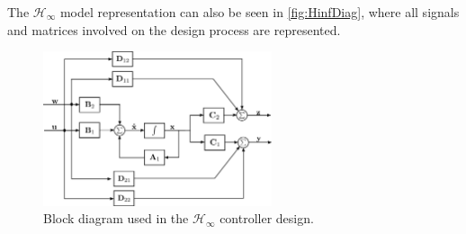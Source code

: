 The $\mathcal{H}_\infty$ model representation can also be seen in \autoref{fig:HinfDiag}, where all signals and matrices involved on the design process are represented.
\begin{figure}[H]
	\includegraphics[width=0.6\textwidth]{figures/HinfDiag}
	\caption{Block diagram used in the $\mathcal{H}_\infty$ controller design.}
	\label{fig:HinfDiag}
\end{figure}
